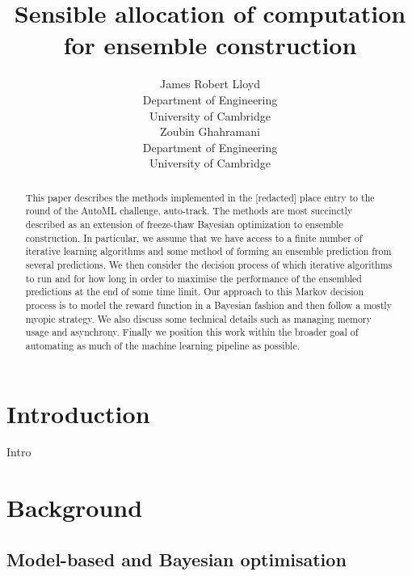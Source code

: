 \documentclass{article} %
\title{Sensible allocation of computation\\for ensemble construction}
\author{
James Robert Lloyd\\
Department of Engineering\\
University of Cambridge\\
\And
Zoubin Ghahramani\\
Department of Engineering\\
University of Cambridge\\
}
\begin{document}
\def\ParamSpace{\Theta}
\def\Param{\theta}
\def\Observation{y}
\def\ObservationVector{Y}
\def\ObservationSpace{\mathcal{Y}}
\def\Func{f}
\def\FuncTime{g}
\def\Noise{\varepsilon}
\def\Input{x}
\def\InputVector{X}
\def\InputSpace{\mathcal{X}}

\maketitle


\begin{abstract} 
This paper describes the methods implemented in the [redacted] place entry to the  round of the AutoML challenge, auto-track.
The methods are most succinctly described as an extension of freeze-thaw Bayesian optimization to ensemble construction.
In particular, we assume that we have access to a finite number of iterative learning algorithms and some method of forming an ensemble prediction from several predictions.
We then consider the decision process of which iterative algorithms to run and for how long in order to maximise the performance of the ensembled predictions at the end of some time limit.
Our approach to this Markov decision process is to model the reward function in a Bayesian fashion and then follow a mostly myopic strategy.
We also discuss some technical details such as managing memory usage and asynchrony.
Finally we position this work within the broader goal of automating as much of the machine learning pipeline as possible.
\end{abstract} 

\allowdisplaybreaks


\section{Introduction}

Intro

\section{Background}

\subsection{Model-based and Bayesian optimisation}
\end{document}
